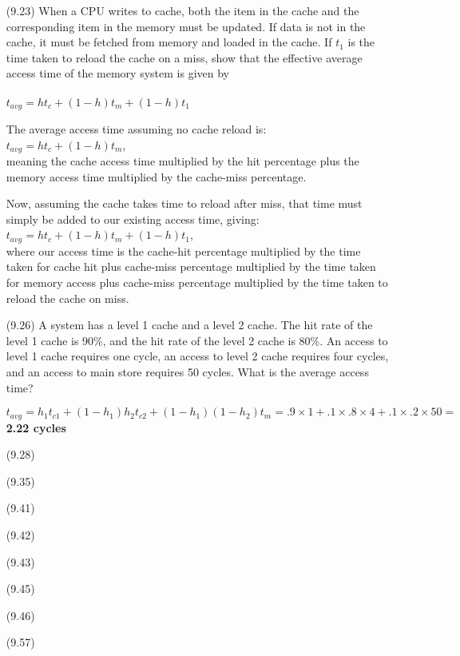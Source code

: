 \documentclass[letterpaper,10pt,titlepage]{article}
\begin{document}
\begin{enumerate}
	\item[(9.23)] When a CPU writes to cache, both the item in the cache and the
		corresponding item in the memory must be updated. If data is not in the
		cache, it must be fetched from memory and loaded in the cache. If $t_{1}$
		is the time taken to reload the cache on a miss, show that the effective
		average access time of the memory system is given by \\ \\
		$t_{avg}=ht_{c}+(1-h)t_{m}+(1-h)t_{1}$
	\item[\textbullet] The average access time assuming no cache reload is:\\
		$t_{avg}=ht_{c}+(1-h)t_{m}$,\\
		meaning the cache access time multiplied by the hit percentage plus the
		memory access time multiplied by the cache-miss percentage.
	\item[\textbullet] Now, assuming the cache takes time to reload after miss, that
		time must simply be added to our existing access time, giving:\\
		$t_{avg}=ht_{c}+(1-h)t_{m}+(1-h)t_{1}$,\\
		where our access time is the cache-hit percentage multiplied by the time
		taken for cache hit plus cache-miss percentage multiplied by the time
		taken for memory access plus cache-miss percentage multiplied by the time
		taken to reload the cache on miss.

	\item[(9.26)] A system has a level 1 cache and a level 2 cache. The hit rate of
		the level 1 cache is 90\%, and the hit rate of the level 2 cache is 80\%.
		An access to level 1 cache requires one cycle, an access to level 2 cache
		requires four cycles, and an access to main store requires 50 cycles. What
		is the average access time?
	\item[\textbullet]
		$t_{avg}=h_{1}t_{c1}+(1-h_{1})h_{2}t_{c2}+(1-h_{1})(1-h_{2})t_{m}=.9\times1+.1\times.8\times4+.1\times.2\times50=$ \textbf{2.22 cycles}

	\item[(9.28)]

	\item[(9.35)]

	\item[(9.41)]

	\item[(9.42)]

	\item[(9.43)]

	\item[(9.45)]

	\item[(9.46)]

	\item[(9.57)]

\end{enumerate}
\end{document}
